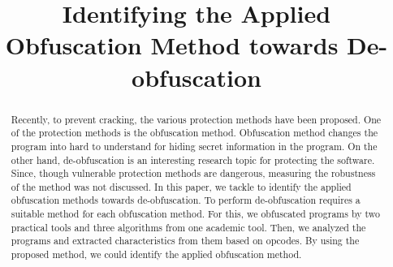 \documentclass[conference]{IEEEtran}
\begin{document}
\title{Identifying the Applied Obfuscation Method towards De-obfuscation}

\author{
\and
{}
}

\maketitle

\begin{abstract}
  Recently, to prevent cracking, the various protection methods have
  been proposed.  One of the protection methods is the obfuscation
  method. Obfuscation method changes the program into hard to
  understand for hiding secret information in the program.
  On the other hand, de-obfuscation is an interesting research topic
  for protecting the software.  Since, though vulnerable protection
  methods are dangerous, measuring the robustness of the method was not
  discussed.
  In this paper, we tackle to identify the applied obfuscation methods
  towards de-obfuscation.  To perform de-obfuscation requires a
  suitable method for each obfuscation method.  For this, we
  obfuscated programs by two practical tools and three algorithms from
  one academic tool.  Then, we analyzed the programs and extracted
  characteristics from them based on opcodes.  By using the proposed
  method, we could identify the applied obfuscation method.
\end{abstract}
\end{document}
